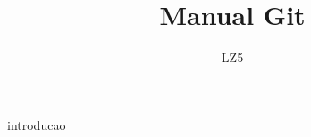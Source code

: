 \documentclass[a4paper,11pt,draft]{article}
\title{Manual Git}
\author{LZ5}
\begin{document}
\maketitle
\newpage
\tableofcontents
\newpage
 {introducao}

\end{document}
